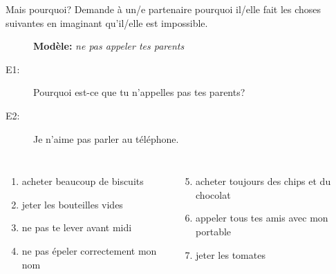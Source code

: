 \begin{frame}{Mais pourquoi?}
  Demande à un/e partenaire pourquoi il/elle fait les choses suivantes en imaginant qu'il/elle est impossible. \\
  \begin{description}
    \item[] \textbf{Modèle:} \emph{ne pas appeler tes parents}
    \item[E1:] Pourquoi est-ce que tu n'appelles pas tes parents?
    \item[E2:] Je n'aime pas parler au téléphone.
  \end{description}
  \begin{columns}[t]
      \begin{enumerate}
        \item acheter beaucoup de biscuits
        \item jeter les bouteilles vides 
        \item ne pas te lever avant midi
        \item ne pas épeler correctement mon nom
      \end{enumerate}
      \begin{enumerate}
        \setcounter{enumi}{4}
        \item acheter toujours des chips et du chocolat
        \item appeler tous tes amis avec mon portable
        \item jeter les tomates
      \end{enumerate}
  \end{columns}
\end{frame}